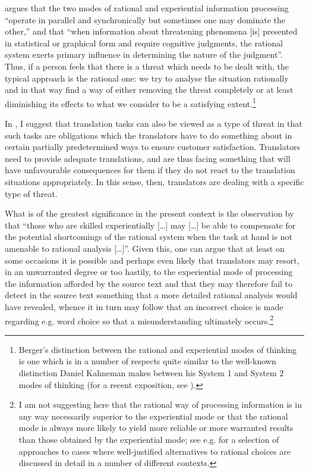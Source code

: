 \documentclass[output=paper]{LSP/langsci}
\begin{document}
  \citet[215]{Berger2007} argues that the two modes of rational and experiential information processing ``operate in parallel and synchronically but sometimes one may dominate the other,'' and that ``when information about threatening phenomena [is] presented in statistical or graphical form and require cognitive judgments, the rational system exerts primary influence in determining the nature of the judgment''. Thus, if a person feels that there is a threat which needs to be dealt with, the typical approach is the rational one: we try to analyse the situation rationally and in that way find a way of either removing the threat completely or at least diminishing its effects to what we consider to be a satisfying extent.\footnote{Berger's \citeyearpar{Berger2007} distinction between the rational and experiential modes of thinking is one which is in a number of respects quite similar to the well-known distinction Daniel Kahneman makes between his System 1 and System 2 modes of thinking (for a recent exposition, see \citealt{Kahneman2011}).}

  In \citet{Hietaranta2014}, I suggest that translation tasks can also be viewed as a type of threat in that such tasks are obligations which the translators have to do something about in certain partially predetermined ways to ensure customer satisfaction. Translators need to provide adequate translations, and are thus facing something that will have unfavourable consequences for them if they do not react to the translation situations appropriately. In this sense, then, translators are dealing with a specific type of threat.

  \largerpage[-1]
  What is of the greatest significance in the present context is the observation by \citet[228]{Berger2007} that ``those who are skilled experientially [\ldots]\xspace may [\ldots]\xspace  be able to compensate for the potential shortcomings of the rational system when the task at hand is not amenable to rational analysis [\ldots]''. Given this, one can argue that at least on some occasions it is possible and perhaps even likely that translators may resort, in an unwarranted degree or too hastily, to the experiential mode of processing the information afforded by the source text and that they may therefore fail to detect in the source text something that a more detailed rational analysis would have revealed, whence it in turn may follow that an incorrect choice is made regarding e.g. word choice so that a misunderstanding ultimately occurs.\footnote{I am not suggesting here that the rational way of processing information is in any way necessarily superior to the experiential mode or that the rational mode is always more likely to yield more reliable or more warranted results than those obtained by the experiential mode; see e.g. \citet{Zey1992} for a selection of approaches to cases where well-justified alternatives to rational choices are discussed in detail in a number of different contexts.}
\end{document}
